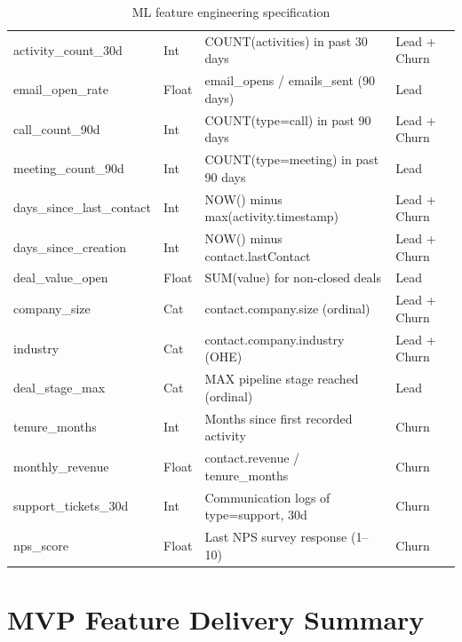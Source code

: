 \begin{table}[H]
  \centering
  \caption{ML feature engineering specification}
  \label{tab:features}
  \begin{tabularx}{\textwidth}{@{}L{3.2cm} C{1.1cm} L{5.0cm} C{2.3cm}@{}}
    \toprule
     &  &  &
     \\
    \midrule
    activity\_count\_30d      & Int   & COUNT(activities) in past 30 days        & Lead + Churn \\
    email\_open\_rate         & Float & email\_opens / emails\_sent (90 days)    & Lead \\
    call\_count\_90d          & Int   & COUNT(type=call) in past 90 days         & Lead + Churn \\
    meeting\_count\_90d       & Int   & COUNT(type=meeting) in past 90 days      & Lead \\
    days\_since\_last\_contact & Int  & NOW() minus max(activity.timestamp)      & Lead + Churn \\
    days\_since\_creation     & Int   & NOW() minus contact.lastContact           & Lead + Churn \\
    deal\_value\_open         & Float & SUM(value) for non-closed deals          & Lead \\
    company\_size             & Cat   & contact.company.size (ordinal)           & Lead + Churn \\
    industry                  & Cat   & contact.company.industry (OHE)           & Lead + Churn \\
    deal\_stage\_max          & Cat   & MAX pipeline stage reached (ordinal)     & Lead \\
    tenure\_months            & Int   & Months since first recorded activity      & Churn \\
    monthly\_revenue          & Float & contact.revenue / tenure\_months         & Churn \\
    support\_tickets\_30d     & Int   & Communication logs of type=support, 30d  & Churn \\
    nps\_score                & Float & Last NPS survey response (1--10)         & Churn \\
    \bottomrule
  \end{tabularx}
\end{table}
 
\section{MVP Feature Delivery Summary}
 
